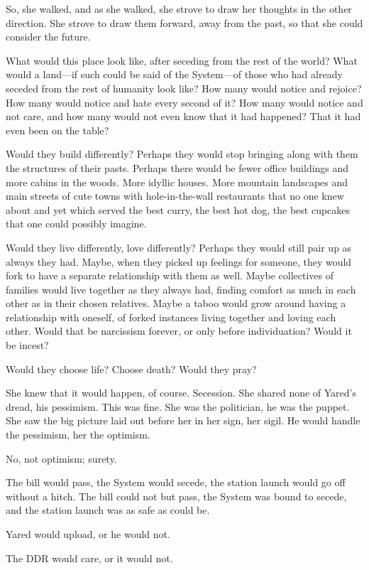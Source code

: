So, she walked, and as she walked, she strove to draw her thoughts in the other direction. She strove to draw them forward, away from the past, so that she could consider the future.

What would this place look like, after seceding from the rest of the world? What would a land---if such could be said of the System---of those who had already seceded from the rest of humanity look like? How many would notice and rejoice? How many would notice and hate every second of it? How many would notice and not care, and how many would not even know that it had happened? That it had even been on the table?

Would they build differently? Perhaps they would stop bringing along with them the structures of their pasts. Perhaps there would be fewer office buildings and more cabins in the woods. More idyllic houses. More mountain landscapes and main streets of cute towns with hole-in-the-wall restaurants that no one knew about and yet which served the best curry, the best hot dog, the best cupcakes that one could possibly imagine.

Would they live differently, love differently? Perhaps they would still pair up as always they had. Maybe, when they picked up feelings for someone, they would fork to have a separate relationship with them as well. Maybe collectives of families would live together as they always had, finding comfort as much in each other as in their chosen relatives. Maybe a taboo would grow around having a relationship with oneself, of forked instances living together and loving each other. Would that be narcissism forever, or only before individuation? Would it be incest?

Would they choose life? Choose death? Would they pray?

She knew that it would happen, of course. Secession. She shared none of Yared's dread, his pessimism. This was fine. She was the politician, he was the puppet. She saw the big picture laid out before her in her sign, her sigil. He would handle the pessimism, her the optimism.

No, not optimism; surety.

The bill would pass, the System would secede, the station launch would go off without a hitch. The bill could not but pass, the System was bound to secede, and the station launch was as safe as could be.

Yared would upload, or he would not.

The DDR would care, or it would not.

